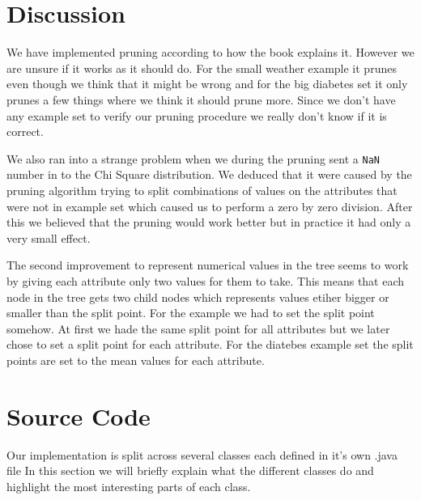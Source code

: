 \documentclass[a4paper]{article}
\begin{document}
\section{Discussion}
We have implemented pruning according to how the book explains it. However we are unsure if it works as it should do. For the small weather example it prunes even though we think that it might be wrong and for the big diabetes set it only prunes a few things where we think it should prune more. Since we don't have any example set to verify our pruning procedure we really don't know if it is correct.

We also ran into a strange problem when we during the pruning sent a \texttt{NaN} number in to the Chi Square distribution. We deduced that it were caused by the pruning algorithm trying to split combinations of values on the attributes that were not in example set which caused us to perform a zero by zero division. After this we believed that the pruning would work better but in practice it had only a very small effect.

The second improvement to represent numerical values in the tree seems to work by giving each attribute only two values for them to take. This means that each node in the tree gets two child nodes which represents values etiher bigger or smaller than the split point. For the example we had to set the split point somehow. At first we hade the same split point for all attributes but we later chose to set a split point for each attribute. For the diatebes example set the split points are set to the mean values for each attribute.


\section{Source Code}
Our implementation is split across several classes each defined in it's own .java file In this section we will briefly explain what the different classes do and highlight the most interesting parts of each class.
\end{document}
